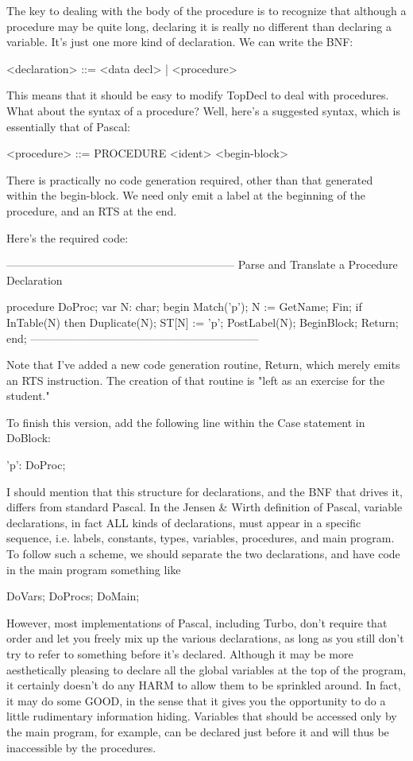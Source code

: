 \documentclass[float=false, crop=false]{standalone}
\begin{document}
The key to dealing with the body of the procedure is to recognize that although
a procedure may be quite long, declaring it is really no different than
declaring a variable. It's just one more kind of declaration. We can write the
BNF:


     <declaration> ::= <data decl> | <procedure>


This means that it should be easy to modify TopDecl to deal with procedures.
What about the syntax of a procedure? Well, here's a suggested syntax, which is
essentially that of Pascal:


     <procedure> ::= PROCEDURE <ident> <begin-block>


There is practically no code generation required, other than that generated
within the begin-block. We need only emit a label at the beginning of the
procedure, and an RTS at the end.

Here's the required code:

\begin{code}
{--------------------------------------------------------------}
{ Parse and Translate a Procedure Declaration }

procedure DoProc;
var N: char;
begin
     Match('p');
     N := GetName;
     Fin;
     if InTable(N) then Duplicate(N);
     ST[N] := 'p';
     PostLabel(N);
     BeginBlock;
     Return;
end;
{--------------------------------------------------------------}
\end{code}

Note that I've added a new code generation routine, Return, which merely emits
an RTS instruction. The creation of that routine is "left as an exercise for the
student."

To finish this version, add the following line within the Case statement in
DoBlock:


            'p': DoProc;


I should mention that this structure for declarations, and the BNF that drives
it, differs from standard Pascal. In the Jensen \& Wirth definition of Pascal,
variable declarations, in fact ALL kinds of declarations, must appear in a
specific sequence, i.e. labels, constants, types, variables, procedures, and
main program. To follow such a scheme, we should separate the two declarations,
and have code in the main program something like


     DoVars;
     DoProcs;
     DoMain;


However, most implementations of Pascal, including Turbo, don't require that
order and let you freely mix up the various declarations, as long as you still
don't try to refer to something before it's declared. Although it may be more
aesthetically pleasing to declare all the global variables at the top of the
program, it certainly doesn't do any HARM to allow them to be sprinkled around.
In fact, it may do some GOOD, in the sense that it gives you the opportunity to
do a little rudimentary information hiding. Variables that should be accessed
only by the main program, for example, can be declared just before it and will
thus be inaccessible by the procedures.
\end{document}

